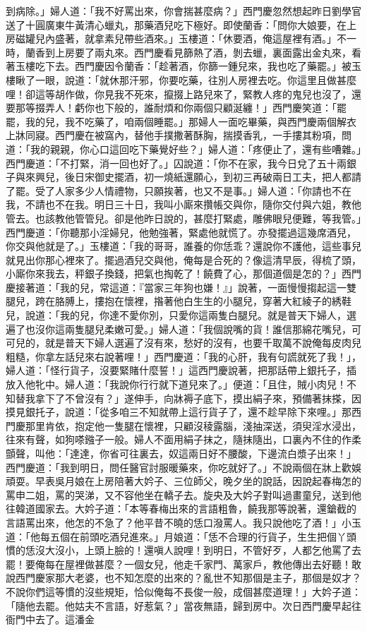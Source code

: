 到病除。」婦人道：「我不好罵出來，你會揣甚麼病？」西門慶忽然想起昨日劉學官送了十圓廣東牛黃清心蠟丸，那藥酒兒吃下極好。即使蘭香：「問你大娘要，在上房磁罐兒內盛著，就拿素兒帶些酒來。」玉樓道：「休要酒，俺這屋裡有酒。」不一時，蘭香到上房要了兩丸來。西門慶看見篩熱了酒，剝去蠟，裏面露出金丸來，看著玉樓吃下去。西門慶因令蘭香：「趁著酒，你篩一鍾兒來，我也吃了藥罷。」被玉樓瞅了一眼，說道：「就休那汗邪，你要吃藥，往別人房裡去吃。你這里且做甚麼哩！卻這等胡作做，你見我不死來，攛掇上路兒來了，緊教人疼的鬼兒也沒了，還要那等掇弄人！虧你也下般的，誰耐煩和你兩個只顧涎纏！」西門慶笑道：「罷罷，我的兒，我不吃藥了，咱兩個睡罷。」那婦人一面吃畢藥，與西門慶兩個解衣上牀同寢。西門慶在被窩內，替他手撲撒著酥胸，揣摸香乳，一手摟其粉項，問道：「我的親親，你心口這回吃下藥覺好些？」婦人道：「疼便止了，還有些嘈雜。」西門慶道：「不打緊，消一回也好了。」囚說道：「你不在家，我今日兌了五十兩銀子與來興兒，後日宋御史擺酒，初一燒紙還願心，到初三再破兩日工夫，把人都請了罷。受了人家多少人情禮物，只願挨著，也又不是事。」婦人道：「你請也不在我，不請也不在我。明日三十日，我叫小廝來攢帳交與你，隨你交付與六姐，教他管去。也該教他管管兒。卻是他昨日說的，甚麼打緊處，雕佛眼兒便難，等我管。」西門慶道：「你聽那小淫婦兒，他勉強著，緊處他就慌了。亦發擺過這幾席酒兒，你交與他就是了。」玉樓道：「我的哥哥，誰養的你恁乖？還說你不護他，這些事兒就見出你那心裡來了。擺過酒兒交與他，俺每是合死的？像這清早辰，得梳了頭，小廝你來我去，秤銀子換錢，把氣也掏乾了！饒費了心，那個道個是怎的？」西門慶接著道：「我的兒，常這道：『當家三年狗也嫌！』」說著，一面慢慢搊起這一雙腿兒，跨在胳膊上，摟抱在懷裡，揝著他白生生的小腿兒，穿著大紅綾子的綉鞋兒，說道：「我的兒，你達不愛你別，只愛你這兩隻白腿兒。就是普天下婦人，選遍了也沒你這兩隻腿兒柔嫩可愛。」婦人道：「我個說嘴的貨！誰信那綿花嘴兒，可可兒的，就是普天下婦人選遍了沒有來，愁好的沒有，也要千取萬不說俺每皮肉兒粗糙，你拿左話兒來右說著哩！」西門慶道：「我的心肝，我有句謊就死了我！」，婦人道：「怪行貨子，沒要緊賭什麼誓！」這西門慶說著，把那話帶上銀托子，插放入他牝中。婦人道：「我說你行行就下道兒來了。」便道：「且住，賊小肉兒！不知替我拿下了不曾沒有？」遂伸手，向牀褥子底下，摸出絹子來，預備著抹搽，因摸見銀托子，說道：「從多咱三不知就帶上這行貨子了，還不趁早除下來哩。」那西門慶那里肯依，抱定他一隻腿在懷裡，只顧沒稜露腦，淺抽深送，須臾淫水浸出，往來有聲，如狗嗏鏹子一般。婦人不面用絹子抹之，隨抹隨出，口裏內不住的作柔顫聲，叫他：「達達，你省可往裏去，奴這兩日好不腰酸，下邊流白漿子出來！」西門慶道：「我到明日，問任醫官討服暖藥來，你吃就好了。」不說兩個在牀上歡娛頑耍。早表吳月娘在上房陪著大妗子、三位師父，晚夕坐的說話，因說起春梅怎的罵申二姐，罵的哭涕，又不容他坐在轎子去。旋央及大妗子對叫過畫童兒，送到他往韓道國家去。大妗子道：「本等春梅出來的言語粗魯，饒我那等說著，還鎗截的言語罵出來，他怎的不急了？他平昔不曉的恁口潑罵人。我只說他吃了酒！」小玉道：「他每五個在前頭吃酒兒進來。」月娘道：「恁不合理的行貨子，生生把個丫頭慣的恁沒大沒小，上頭上臉的！還嗔人說哩！到明日，不管好歹，人都乞他罵了去罷！要俺每在屋裡做甚麼？一個女兒，他走千家門、萬家戶，教他傳出去好聽！敢說西門慶家那大老婆，也不知怎麼的出來的？亂世不知那個是主子，那個是奴才？不說你們這等慣的沒些規矩，恰似俺每不長俊一般，成個甚麼道理！」大妗子道：「隨他去罷。他姑夫不言語，好惹氣？」當夜無語，歸到房中。次日西門慶早起往衙門中去了。這潘金
